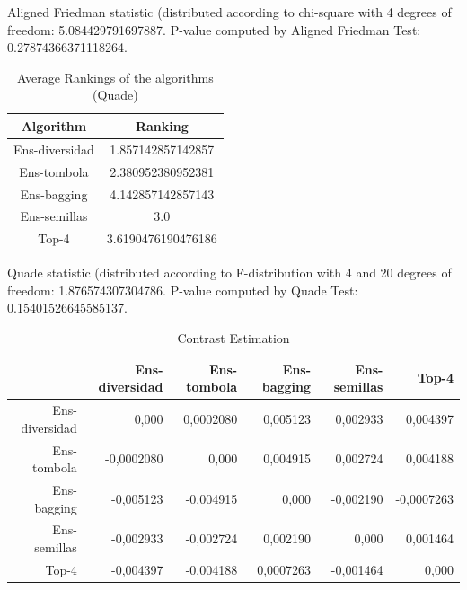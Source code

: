 \documentclass[a4paper,10pt]{article}
\begin{document}
\begin{landscape}
Aligned Friedman statistic (distributed according to chi-square with 4 degrees of freedom: 5.084429791697887. 
P-value computed by Aligned Friedman Test: 0.27874366371118264.\newline


\newpage

\begin{table}[!htp]
\centering
\caption{Average Rankings of the algorithms (Quade)
}\begin{tabular}{c|c}
Algorithm&Ranking\\
\hline
Ens-diversidad&1.857142857142857\\
Ens-tombola&2.380952380952381\\
Ens-bagging&4.142857142857143\\
Ens-semillas&3.0\\
Top-4&3.6190476190476186\\
\end{tabular}
\end{table}
Quade statistic (distributed according to F-distribution with 4 and 20 degrees of freedom: 1.876574307304786. 
P-value computed by Quade Test: 0.15401526645585137.\newline


\newpage

\begin{table}[!htp]
\centering\tiny
\caption{Contrast Estimation}
\begin{tabular}{
|r|r|r|r|r|r|}
\hline
 &Ens-diversidad&Ens-tombola&Ens-bagging&Ens-semillas&Top-4\\
\hline
Ens-diversidad&0,000&0,0002080&0,005123&0,002933&0,004397\\
\hline
Ens-tombola&-0,0002080&0,000&0,004915&0,002724&0,004188\\
\hline
Ens-bagging&-0,005123&-0,004915&0,000&-0,002190&-0,0007263\\
\hline
Ens-semillas&-0,002933&-0,002724&0,002190&0,000&0,001464\\
\hline
Top-4&-0,004397&-0,004188&0,0007263&-0,001464&0,000\\
\hline

\end{tabular}
\end{table}

\newpage


\end{landscape}
\end{document}
